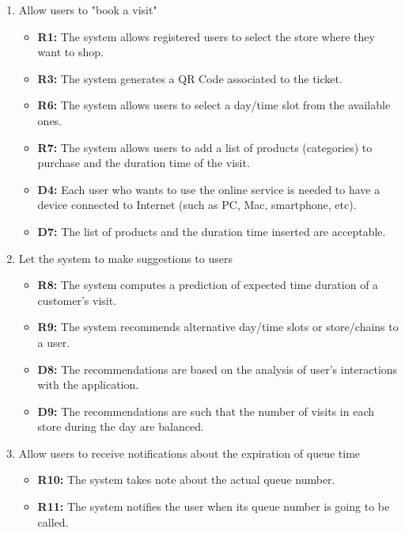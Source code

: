 \documentclass[table, 12pt]{article}
\begin{document}
\begin{flushleft}
\begin{enumerate}[label=\textbf{-G\arabic*}:]
{              }
        \item {Allow users to "book a visit"
              \begin{itemize}
                  \item \textbf{R1:} The system allows registered users to select the store where they want to shop.
                  \item \textbf{R3:} The system generates a QR Code associated to the ticket.
                  \item \textbf{R6:} The system allows users to select a day/time slot from the available ones.
                  \item \textbf{R7:} The system allows users to add a list of products (categories) to purchase and the duration time of the visit.
                  \item \textbf{D4:} Each user who wants to use the online service is needed to have a device connected to Internet (such as PC, Mac, smartphone, etc).
                  \item \textbf{D7:} The list of products and the duration time inserted are acceptable.
              \end{itemize}
              }
        \item {Let the system to make suggestions to users
              \begin{itemize}
                  \item \textbf{R8:} The system computes a prediction of expected time duration of a customer's visit.
                  \item \textbf{R9:} The system recommends alternative day/time slots or store/chains to a user.
                  \item \textbf{D8:} The recommendations are based on the analysis of user's interactions with the application.
                  \item \textbf{D9:} The recommendations are such that the number of visits in each store during the day are balanced.
              \end{itemize}
              }
        \item {Allow users to receive notifications about the expiration of queue time
              \begin{itemize}
                  \item \textbf{R10:} The system takes note about the actual queue number.
                  \item \textbf{R11:} The system notifies the user when its queue number is going to be called.
              \end{itemize}
              }
    \end{enumerate}



\end{flushleft}
\end{document}
